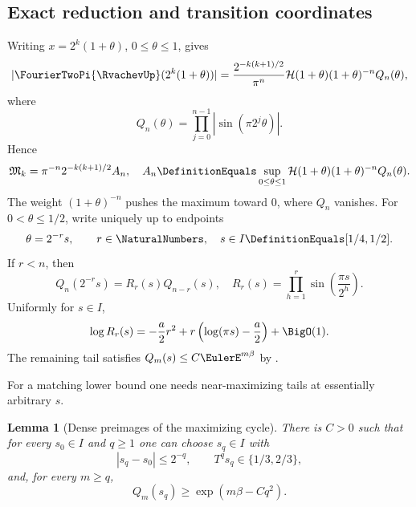 \documentclass[11pt,oneside]{article}
\numberwithin{equation}{section}
\newtheorem{lemma}[theorem]{Lemma}
\theoremstyle{definition}
\theoremstyle{remark}
\begin{document}
\subsection{Exact reduction and transition coordinates}

Writing $x=2^k(1+\theta)$, $0\le\theta\le1$, gives
\begin{equation}
 |\FourierTwoPi{\RvachevUp}(2^k(1+\theta))|
 =\frac{2^{-k(k+1)/2}}{\pi^n}
 \mathcal H(1+\theta)(1+\theta)^{-n}Q_n(\theta),
 \label{eq:annular-exact-final}
\end{equation}
where
\[
 Q_n(\theta)=\prod_{j=0}^{n-1}|\sin(\pi2^j\theta)|.
\]
Hence
\begin{equation}
 \mathfrak M_k=\pi^{-n}2^{-k(k+1)/2}A_n,
 \quad
 A_n\DefinitionEquals\sup_{0\le\theta\le1}
 \mathcal H(1+\theta)(1+\theta)^{-n}Q_n(\theta).
 \label{eq:An-final}
\end{equation}
The weight $(1+\theta)^{-n}$ pushes the maximum toward $0$, where $Q_n$ vanishes.
For $0<\theta\le1/2$, write uniquely up to endpoints
\begin{equation}
 \theta=2^{-r}s,
 \qquad r\in\NaturalNumbers,\quad s\in I\DefinitionEquals[1/4,1/2].
 \label{eq:transition-final}
\end{equation}
If $r<n$, then
\begin{equation}
 Q_n(2^{-r}s)=R_r(s)Q_{n-r}(s),
 \quad
 R_r(s)=\prod_{h=1}^{r}\sin\!\left(\frac{\pi s}{2^h}\right).
 \label{eq:transition-product-final}
\end{equation}
Uniformly for $s\in I$,
\begin{equation}
 \log R_r(s)
 =-\frac a2r^2+r\left(\log(\pi s)-\frac a2\right)+\BigO(1).
 \label{eq:small-block-final}
\end{equation}
The remaining tail satisfies $Q_m(s)\le C\EulerE^{m\beta}$ by
.

For a matching lower bound one needs near-maximizing tails at essentially arbitrary $s$.

\begin{lemma}[Dense preimages of the maximizing cycle]
\label{lem:dense-preimages-final}
There is $C>0$ such that for every $s_0\in I$ and $q\ge1$ one can choose $s_q\in I$ with
\begin{equation}
 |s_q-s_0|\le2^{-q},
 \qquad T^qs_q\in\{1/3,2/3\},
 \label{eq:preimage-close-final}
\end{equation}
and, for every $m\ge q$,
\begin{equation}
 Q_m(s_q)\ge\exp(m\beta-Cq^2).
 \label{eq:preimage-lower-final}
\end{equation}
\end{lemma}
\end{document}
